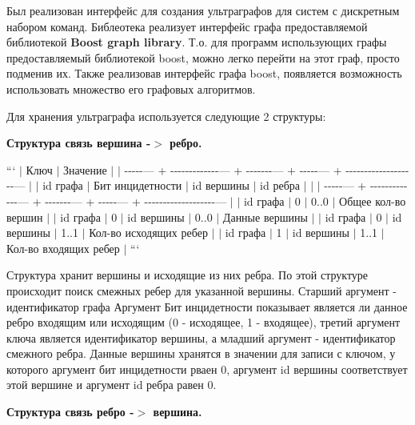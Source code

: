 Был реализован интерфейс для создания ультраграфов для систем с дискретным набором команд. Библеотека реализует интерфейс графа предоставляемой библиотекой {\bfseries Boost graph library}. Т.\+о. для программ использующих графы предоставляемый библиотекой boost, можно легко перейти на этот граф, просто подменив их. Также реализовав интерфейс графа boost, появляется возможность использовать множество его графовых алгоритмов.

Для хранения ультраграфа используется следующие 2 структуры\+:


\begin{DoxyEnumerate}
\item {\bfseries Структура связь вершина -\/$>$ ребро.}

``` $\vert$ Ключ $\vert$ Значение $\vert$ $\vert$ -\/-\/-\/-\/-\/--- + -\/-\/-\/-\/-\/-\/-\/-\/-\/-\/-\/-\/-\/--- + -\/-\/-\/-\/-\/-\/-\/--- + -\/-\/-\/-\/-\/--- + -\/-\/-\/-\/-\/-\/-\/-\/-\/-\/-\/-\/-\/-\/-\/-\/-\/-\/-\/--- $\vert$ $\vert$ id графа $\vert$ Бит инцидетности $\vert$ id вершины $\vert$ id ребра $\vert$ $\vert$ $\vert$ -\/-\/-\/-\/-\/--- + -\/-\/-\/-\/-\/-\/-\/-\/-\/-\/-\/-\/-\/--- + -\/-\/-\/-\/-\/-\/-\/--- + -\/-\/-\/-\/-\/--- + -\/-\/-\/-\/-\/-\/-\/-\/-\/-\/-\/-\/-\/-\/-\/-\/-\/-\/-\/--- $\vert$ $\vert$ id графа $\vert$ 0 $\vert$ 0..0 $\vert$ Общее кол-\/во вершин $\vert$ $\vert$ id графа $\vert$ 0 $\vert$ id вершины $\vert$ 0..0 $\vert$ Данные вершины $\vert$ $\vert$ id графа $\vert$ 0 $\vert$ id вершины $\vert$ 1..1 $\vert$ Кол-\/во исходящих ребер $\vert$ $\vert$ id графа $\vert$ 1 $\vert$ id вершины $\vert$ 1..1 $\vert$ Кол-\/во входящих ребер $\vert$ ```

Структура хранит вершины и исходящие из них ребра. По этой структуре происходит поиск смежных ребер для указанной вершины. Старший аргумент -\/ идентификатор графа Аргумент {\ttfamily Бит инцидетности} показывает является ли данное ребро входящим или исходящим (0 -\/ исходящее, 1 -\/ входящее), третий аргумент ключа является идентификатор вершины, а младший аргумент -\/ идентификатор смежного ребра. Данные вершины хранятся в значении для записи с ключом, у которого аргумент бит инцидетности рваен 0, аргумент {\ttfamily id вершины} соответствует этой вершине и аргумент {\ttfamily id ребра} равен 0.
\item {\bfseries Структура связь ребро -\/$>$ вершина.}


\end{DoxyEnumerate}
